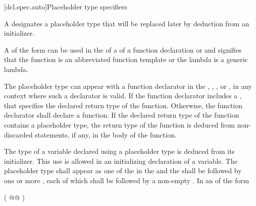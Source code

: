[dcl.spec.auto]{Placeholder type specifiers}%
%

\begin{bnf}
\br
   \br
    \terminal{(}  \terminal{)}
\end{bnf}

\pnum
A 
designates a placeholder type that will be replaced later by deduction
from an initializer.

\pnum
A  of the form
 
can be used in the  of
a  of
a function declaration or  and
signifies that the function is
an abbreviated function template or
the lambda is a generic lambda.

\pnum
The placeholder type can appear with a function declarator in the
, ,
, or ,
in any context where such a declarator is valid. If the function declarator
includes a , that
 specifies
the declared return type of the function. Otherwise, the function declarator
shall declare a function. If the declared return type of the
function contains a placeholder type, the return type of the function is
deduced from non-discarded  statements, if any, in the body
of the function.

\pnum
The type of a variable declared using a placeholder type is
deduced from its initializer.
This use is allowed
in an initializing declaration of a variable.
The placeholder type shall appear as one of the
 in the
 and the
shall be followed by one or more
,
each of which shall
be followed by a non-empty
.
In an  of the form

\begin{codeblock}
( @\textrm{}@ )
\end{codeblock}

